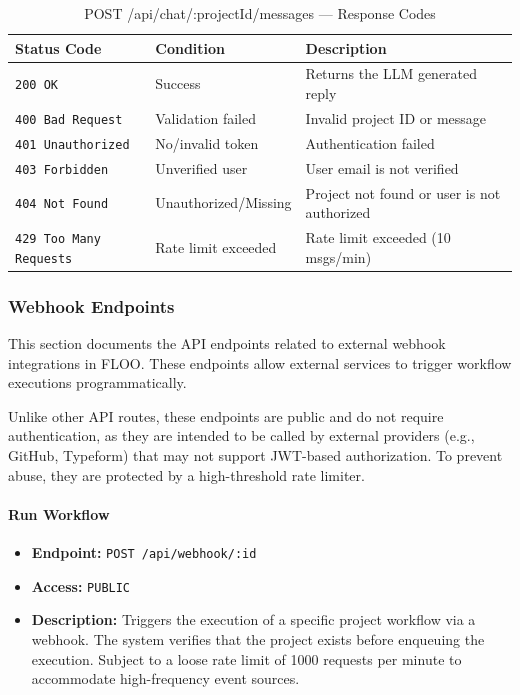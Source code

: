 \begin{table}[H]
\centering
\renewcommand{\arraystretch}{1.3}
\begin{tabularx}{\textwidth}{|l|l|X|}
\hline
\textbf{Status Code} & \textbf{Condition} & \textbf{Description} \\
\hline
\texttt{200 OK}           & Success            & Returns the LLM generated reply \\
\hline
\texttt{400 Bad Request}  & Validation failed  & Invalid project ID or message \\
\hline
\texttt{401 Unauthorized} & No/invalid token   & Authentication failed \\
\hline
\texttt{403 Forbidden}    & Unverified user    & User email is not verified \\
\hline
\texttt{404 Not Found}    & Unauthorized/Missing & Project not found or user is not authorized \\
\hline
\texttt{429 Too Many Requests} & Rate limit exceeded & Rate limit exceeded (10 msgs/min) \\
\hline
\end{tabularx}
\caption{POST /api/chat/:projectId/messages — Response Codes}
\label{tab:reply-to-message-responses}
\end{table}
\FloatBarrier

\subsubsection{Webhook Endpoints}
\label{subsec:webhook-endpoints}

This section documents the API endpoints related to external webhook integrations in FLOO.
These endpoints allow external services to trigger workflow executions programmatically.

Unlike other API routes, these endpoints are public and do not require authentication, 
as they are intended to be called by external providers (e.g., GitHub, Typeform) that may not support JWT-based authorization.
To prevent abuse, they are protected by a high-threshold rate limiter.

\paragraph{Run Workflow}
\label{subsubsec:run-workflow}

\begin{itemize}
  \item \textbf{Endpoint:} \texttt{POST /api/webhook/:id}
  \item \textbf{Access:} \texttt{PUBLIC}
  \item \textbf{Description:} Triggers the execution of a specific project workflow via a webhook. 
  The system verifies that the project exists before enqueuing the execution. 
  Subject to a loose rate limit of 1000 requests per minute to accommodate high-frequency event sources.
\end{itemize}

